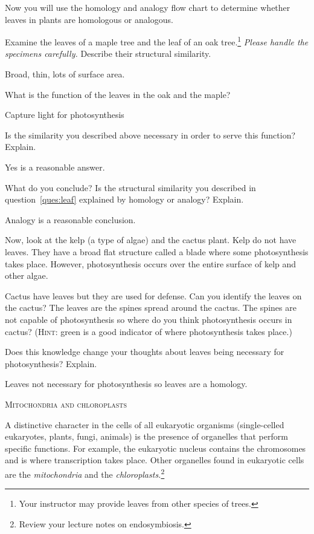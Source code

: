 \documentclass[12pt, hidelinks]{exam}
\newcommand*\AnswerBox[2]{%
    \parbox[t][#1]{0.92\textwidth}{%
    \begin{solution}#2\end{solution}}
    \vspace{\stretch{1}}
}
\begin{document}
\begin{questions}
Now you will use the homology and analogy flow chart to determine whether leaves in plants are homologous or analogous.

\question\label{ques:leaf}
Examine the leaves of a maple tree and the leaf of
an oak tree.\footnote{Your instructor may provide leaves from other species of trees.} \emph{Please
handle the specimens carefully.} Describe their structural similarity.

\AnswerBox{3\baselineskip}{Broad, thin, lots of surface area.}

\question
What is the function of the leaves in the oak and the maple?

\AnswerBox{4\baselineskip}{Capture light for photosynthesis}

\question
Is the similarity you described above necessary in order to serve
this function? Explain. 

\AnswerBox{4\baselineskip}{Yes is a reasonable answer.}

\question
What do you conclude? Is the structural similarity you described in
question~\ref{ques:leaf} explained by homology or analogy? Explain.

\AnswerBox{4\baselineskip}{Analogy is a reasonable conclusion.}

\newpage

\question
Now, look at the kelp (a type of algae) and the cactus plant. Kelp do 
not have leaves. They have a broad flat structure called a blade where
some photosynthesis takes place. However, photosynthesis occurs over
the entire surface of kelp and other algae.

Cactus have leaves but they are used for defense. Can you identify the leaves on the
cactus? The leaves are the spines spread around the cactus. The spines are not
capable of photosynthesis so where do you think photosynthesis occurs in cactus? 
(\textsc{Hint:} green is a good indicator of where photosynthesis takes place.)

Does this knowledge change your thoughts about leaves being necessary for
photosynthesis? Explain. %

\AnswerBox{3\baselineskip}{Leaves not necessary for photosynthesis so leaves are a homology.}

\bigskip

\textsc{Mitochondria and chloroplasts}

\bigskip

A distinctive character in the cells of all eukaryotic organisms 
(single-celled eukaryotes, plants, fungi, animals)  is the presence of 
organelles that perform specific functions. For example, the eukaryotic 
nucleus contains the chromosomes and is where transcription takes place. 
Other organelles found in eukaryotic cells are the \emph{mitochondria} and
the \emph{chloroplasts.}\footnote{Review your lecture notes on endosymbiosis.}


\end{questions}
\end{document}
